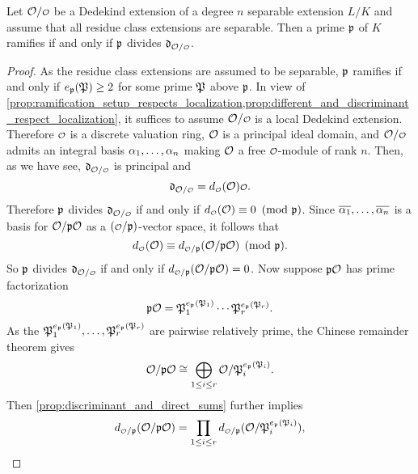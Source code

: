     \begin{theorem}\label{thm:ramifies_if_and_only_if_divides_the_discriminant}
      Let $\mc{O}/\smc{O}$ be a Dedekind extension of a degree $n$ separable extension $L/K$ and assume that all residue class extensions are separable. Then a prime $\mathfrak{p}$ of $K$ ramifies if and only if $\mathfrak{p}$ divides $\mf{d}_{\mc{O}/\smc{O}}$.
    \end{theorem}
    \begin{proof}
      As the residue class extensions are assumed to be separable, $\mathfrak{p}$ ramifies if and only if $e_{\mathfrak{p}}(\mathfrak{P}) \ge 2$ for some prime $\mathfrak{P}$ above $\mathfrak{p}$. In view of \cref{prop:ramification_setup_respects_localization,prop:different_and_discriminant_respect_localization}, it suffices to assume $\mc{O}/\smc{O}$ is a local Dedekind extension. Therefore $\smc{O}$ is a discrete valuation ring, $\mathcal{O}$ is a principal ideal domain, and $\mc{O}/\smc{O}$ admits an integral basis $\alpha_{1},\ldots,\alpha_{n}$ making $\mathcal{O}$ a free $\smc{O}$-module of rank $n$. Then, as we have see, $\mf{d}_{\mc{O}/\smc{O}}$ is principal and
      \[
        \mf{d}_{\mc{O}/\smc{O}} = d_{\smc{O}}(\mc{O})\smc{O}.
      \]
      Therefore $\mathfrak{p}$ divides $\mf{d}_{\mc{O}/\smc{O}}$ if and only if $d_{\smc{O}}(\mc{O}) \equiv 0 \tmod{\mf{p}}$. Since $\overline{\alpha_{1}},\ldots,\overline{\alpha_{n}}$ is a basis for $\mathcal{O}/\mathfrak{p}\mathcal{O}$ as a $(\smc{O}/\mf{p})$-vector space, it follows that
      \[
        d_{\smc{O}}(\mc{O}) \equiv d_{\smc{O}/\mf{p}}(\mc{O}/\mf{p}\mc{O}) \pmod{\mf{p}}.
      \]
      So $\mathfrak{p}$ divides $\mf{d}_{\mc{O}/\smc{O}}$ if and only if $d_{\smc{O}/\mf{p}}(\mc{O}/\mf{p}\mc{O}) = 0$. Now suppose $\mathfrak{p}\mathcal{O}$ has prime factorization
      \[
        \mathfrak{p}\mathcal{O} = \mathfrak{P}_{1}^{e_{\mathfrak{p}}(\mathfrak{P}_{1})} \cdots \mathfrak{P}_{r}^{e_{\mathfrak{p}}(\mathfrak{P}_{r})}.
      \]
      As the $\mathfrak{P}_{1}^{e_{\mathfrak{p}}(\mathfrak{P}_{1})},\ldots,\mathfrak{P}_{r}^{e_{\mathfrak{p}}(\mathfrak{P}_{r})}$ are pairwise relatively prime, the Chinese remainder theorem gives
      \[
        \mathcal{O}/\mathfrak{p}\mathcal{O} \cong \bigoplus_{1 \le i \le r} \mathcal{O}/\mathfrak{P}_{i}^{e_{\mathfrak{p}}(\mathfrak{P}_{i})}.
      \]
      Then \cref{prop:discriminant_and_direct_sums} further implies
      \[
        d_{\smc{O}/\mf{p}}(\mc{O}/\mf{p}\mc{O}) = \prod_{1 \le i \le r}d_{\smc{O}/\mf{p}}(\mc{O}/\mf{P}_{i}^{e_{\mf{p}}(\mf{P}_{i})}),
      \]

\end{proof}
